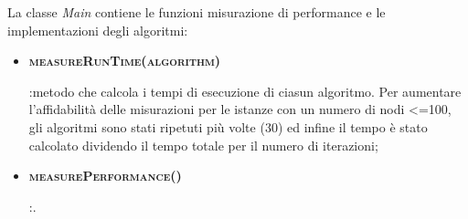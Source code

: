 La classe \textit{Main} contiene le funzioni misurazione di performance e le implementazioni degli algoritmi:

\begin{itemize}
    \item \hypertarget{measureRunTime}{\textbf{\textsc{measureRunTime(algorithm)}}}:metodo che calcola i tempi di esecuzione di ciasun algoritmo. Per aumentare l'affidabilità delle misurazioni per le istanze con un numero di nodi <=100, gli algoritmi sono stati ripetuti più volte (30) ed infine il tempo è stato calcolato dividendo il tempo totale per il numero di iterazioni;
    \item \hypertarget{measurePerformance}{\textbf{\textsc{measurePerformance()}}}:.
\end{itemize}


\newpage